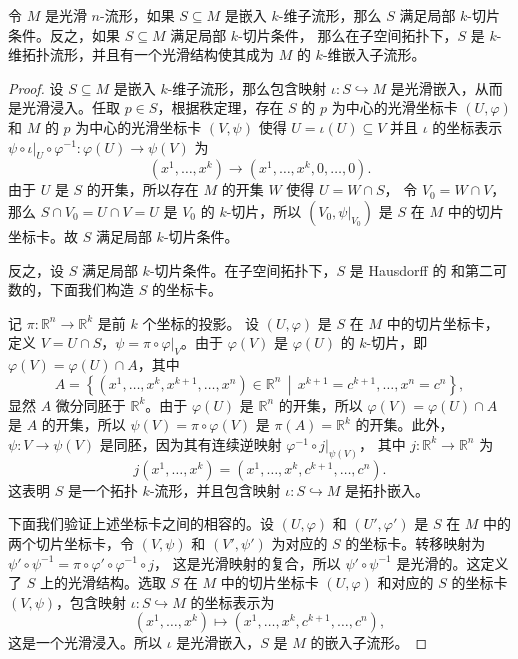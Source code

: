 \documentclass[fontset=none]{Notes}
\begin{document}
\begin{theorem}[嵌入子流形的局部切片判别法]
  令 $M$ 是光滑 $n$-流形，如果 $S\subseteq M$ 是嵌入 $k$-维子流形，那么
  $S$ 满足局部 $k$-切片条件。反之，如果 $S\subseteq M$ 满足局部 $k$-切片条件，
  那么在子空间拓扑下，$S$ 是 $k$-维拓扑流形，并且有一个光滑结构使其成为
  $M$ 的 $k$-维嵌入子流形。
\end{theorem}
\begin{proof}
  设 $S\subseteq M$ 是嵌入 $k$-维子流形，那么包含映射 $\iota:S\hookrightarrow M$
  是光滑嵌入，从而是光滑浸入。任取 $p\in S$，根据秩定理，存在 $S$
  的 $p$ 为中心的光滑坐标卡 $(U,\varphi)$ 和 $M$ 的 $p$ 为中心的光滑坐标卡
  $(V,\psi)$ 使得 $U=\iota(U)\subseteq V$ 并且 $\iota$ 的坐标表示
  $\psi\circ\iota|_U\circ\varphi^{-1}:\varphi(U)\to \psi(V)$ 为
  \[
    \left(x^1,\dots,x^k\right)  \to\left(x^1,\dots,x^k,0,\dots,0\right).
  \]
  由于 $U$ 是 $S$ 的开集，所以存在 $M$ 的开集 $W$ 使得 $U=W\cap S$，
  令 $V_0=W\cap V$，那么 $S\cap V_0=U\cap V=U$ 是 $V_0$
  的 $k$-切片，所以 $(V_0,\psi|_{V_0})$ 是 $S$ 在 $M$
  中的切片坐标卡。故 $S$ 满足局部 $k$-切片条件。

  反之，设 $S$ 满足局部 $k$-切片条件。在子空间拓扑下，$S$ 是 Hausdorff 的
  和第二可数的，下面我们构造 $S$ 的坐标卡。

  记 $\pi:\mathbb{R}^n\to\mathbb{R}^k$ 是前 $k$ 个坐标的投影。
  设 $(U,\varphi)$ 是 $S$ 在 $M$ 中的切片坐标卡，定义
  $V=U\cap S$，$\psi=\pi\circ\varphi|_V$。由于 $\varphi(V)$
  是 $\varphi(U)$ 的 $k$-切片，即 $\varphi(V)=\varphi(U)\cap A$，其中
  \[
    A=\left\{\left(x^1,\dots,x^k,x^{k+1},\dots,x^n\right)\in\mathbb{R}^n\,\middle|\,
      x^{k+1}=c^{k+1},\dots,x^n=c^n
    \right\},
  \]
  显然 $A$ 微分同胚于 $\mathbb{R}^k$。由于 $\varphi(U)$ 是 $\mathbb{R}^n$
  的开集，所以 $\varphi(V)=\varphi(U)\cap A$ 是 $A$ 的开集，所以
  $\psi(V)=\pi\circ\varphi(V)$ 是 $\pi(A)=\mathbb{R}^k$ 的开集。此外，
  $\psi:V\to\psi(V)$ 是同胚，因为其有连续逆映射 $\varphi^{-1}\circ j|_{\psi(V)}$，
  其中 $j:\mathbb{R}^k\to\mathbb{R}^n$ 为 
  \[
    j\left(x^1,\dots,x^k\right)=\left(x^1,\dots,x^k,c^{k+1},\dots,c^n\right).
  \]
  这表明 $S$ 是一个拓扑 $k$-流形，并且包含映射 $\iota:S\hookrightarrow M$ 是拓扑嵌入。

  下面我们验证上述坐标卡之间的相容的。设 $(U,\varphi)$ 和 $(U',\varphi')$ 是
  $S$ 在 $M$ 中的两个切片坐标卡，令 $(V,\psi)$ 和 $(V',\psi')$ 为对应的
  $S$ 的坐标卡。转移映射为 $\psi'\circ\psi^{-1}=\pi\circ\varphi'\circ\varphi^{-1}\circ j$，
  这是光滑映射的复合，所以 $\psi'\circ\psi^{-1}$ 是光滑的。这定义了 $S$
  上的光滑结构。选取 $S$ 在 $M$ 中的切片坐标卡 $(U,\varphi)$ 和对应的 $S$
  的坐标卡 $(V,\psi)$，包含映射 $\iota:S\hookrightarrow M$ 的坐标表示为
  \[
    \left(x^1,\dots,x^k\right)\mapsto\left(
      x^1,\dots,x^k,c^{k+1},\dots,c^n
    \right),
  \]
  这是一个光滑浸入。所以 $\iota$ 是光滑嵌入，$S$ 是 $M$ 的嵌入子流形。
\end{proof}
\end{document}
